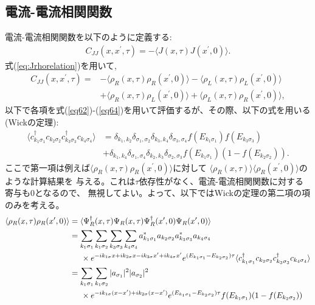 \documentclass[10pt,a4j]{jarticle}
\begin{document}
\subsection{電流-電流相関関数}

電流-電流相関関数を以下のように定義する:
\begin{align}
C_{JJ}(x,x^\prime,\tau) = - \langle J(x,\tau) J(x^\prime,0) \rangle.
\end{align}
式(\ref{eq:Jrhorelation})を用いて, 
\begin{align}
C_{JJ}(x,x^\prime,\tau) = 
&- \langle \rho_R(x,\tau) \rho_R(x^\prime,0) \rangle
- \langle \rho_L(x,\tau) \rho_L(x^\prime,0) \rangle \nonumber \\
&+ \langle \rho_R(x,\tau) \rho_L(x^\prime,0) \rangle
+ \langle \rho_L(x,\tau) \rho_R(x^\prime,0) \rangle ,
\end{align}
以下で各項を式(\ref{eq62})-(\ref{eq64})を用いて評価するが、その際、以下の式を用いる(Wickの定理): 
\begin{align}
\langle c_{k_1\sigma_1}^\dagger c_{k_2\sigma_2} c^\dagger_{k_3\sigma_3} c_{k_4\sigma_4} \rangle
& = \delta_{k_1,k_2} \delta_{\sigma_1,\sigma_2} \delta_{k_3,k_4} \delta_{\sigma_3,\sigma_4} 
f(E_{k_1\sigma_1}) f(E_{k_3\sigma_3}) \nonumber \\
& + \delta_{k_1,k_4} \delta_{\sigma_1,\sigma_4} \delta_{k_2,k_3} \delta_{\sigma_2,\sigma_3} 
f(E_{k_1\sigma_1}) (1-f(E_{k_2\sigma_2})).
\end{align}
ここで第一項は例えば$\langle \rho_R(x,\tau) \rho_R(x^\prime,0) \rangle$に対して
$\langle \rho_R(x,\tau)\rangle \langle \rho_R(x^\prime,0)\rangle$のような計算結果を
与える。これは$\tau$依存性がなく、電流-電流相関関数に対する寄与も0となるので、
無視してよい。よって、以下ではWickの定理の第二項の項のみを考える。
\begin{align}
\langle \rho_R(x,\tau) \rho_R(x^\prime,0) \rangle
& = \langle \Psi^\dagger_R(x,\tau) \Psi_R(x,\tau) \Psi^\dagger_R(x^\prime,0) \Psi_R(x^\prime,0) \rangle \nonumber \\
& = \sum_{k_1\sigma_1} \sum_{k_1\sigma_2} \sum_{k_3\sigma_3} \sum_{k_4\sigma_4} 
a_{k_1\sigma_1}^* a_{k_2\sigma_2} a_{k_3\sigma_3}^* a_{k_4\sigma_4} \nonumber \\
& \hspace{5mm} \times e^{-ik_{1\sigma}x+ik_{2\sigma}x-ik_{3\sigma}x^\prime+ik_{4\sigma}x^\prime} e^{(E_{k_1\sigma_1}-E_{k_2\sigma_2})\tau}
\langle c_{k_1\sigma_1}^\dagger c_{k_2\sigma_2} c^\dagger_{k_3\sigma_3} c_{k_4\sigma_4} \rangle \nonumber \\
&=  \sum_{k_1\sigma_1} \sum_{k_1\sigma_2} |a_{\sigma_1}|^2  |a_{\sigma_2}|^2
\nonumber \\ & \hspace{5mm} \times  e^{-ik_{1\sigma}(x-x^\prime)+ik_{2\sigma}(x-x^\prime)}
e^{(E_{k_1\sigma_1}-E_{k_2\sigma_2})\tau} f(E_{k_1\sigma_1}) (1-f(E_{k_2\sigma_2}))
\end{align}
\end{document}

